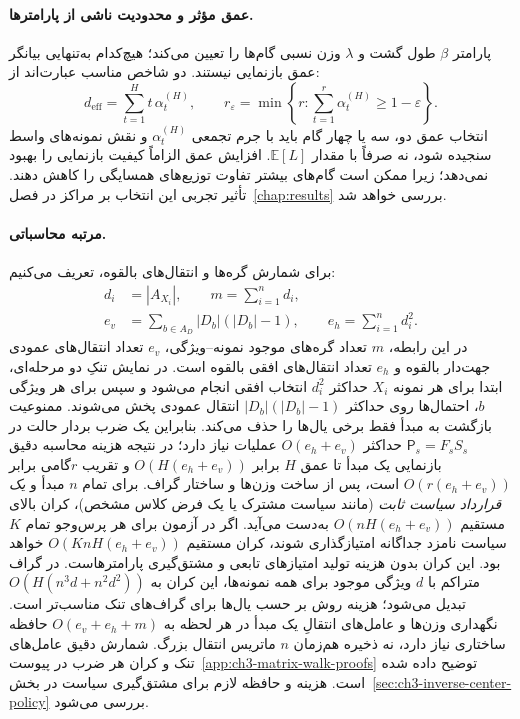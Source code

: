 \paragraph{عمق مؤثر و محدودیت ناشی از پارامترها.}
پارامتر $\beta$ طول گشت و $\lambda$ وزن نسبی گام‌ها را تعیین می‌کند؛ هیچ‌کدام به‌تنهایی بیانگر عمق بازنمایی نیستند. دو شاخص مناسب عبارت‌اند از:
\begin{equation}\label{eq:ch3-effective-depth}
d_{\mathrm{eff}}=\sum_{t=1}^{H}t\,\alpha_t^{(H)},
\qquad
r_\varepsilon=\min\left\{r:\sum_{t=1}^{r}
\alpha_t^{(H)}\ge1-\varepsilon\right\}.
\end{equation}
انتخاب عمق دو، سه یا چهار گام باید با جرم تجمعی $\alpha_t^{(H)}$ و نقش نمونه‌های واسط سنجیده شود، نه صرفاً با مقدار $\mathbb E[L]$. افزایش عمق الزاماً کیفیت بازنمایی را بهبود نمی‌دهد؛ زیرا ممکن است گام‌های بیشتر تفاوت توزیع‌های همسایگی را کاهش دهند. تأثیر تجربی این انتخاب بر مراکز در فصل~\ref{chap:results} بررسی خواهد شد.

\paragraph{مرتبه محاسباتی.}
برای شمارش گره‌ها و انتقال‌های بالقوه، تعریف می‌کنیم:
\begin{equation}\label{eq:ch3-graph-size}
\begin{aligned}
d_i&=|A_{X_i}|,\qquad m=\sum_{i=1}^{n}d_i,\\
e_v&=\sum_{b\in A_D}|D_b|(|D_b|-1),\qquad
e_h=\sum_{i=1}^{n}d_i^2.
\end{aligned}
\end{equation}
در این رابطه، $m$ تعداد گره‌های موجود نمونه--ویژگی، $e_v$ تعداد انتقال‌های عمودی جهت‌دار بالقوه و $e_h$ تعداد انتقال‌های افقی بالقوه است. در نمایش تنکِ دو مرحله‌ای، ابتدا برای هر نمونه $X_i$
حداکثر $d_i^2$ انتخاب افقی انجام می‌شود و سپس
برای هر ویژگی $b$، احتمال‌ها روی حداکثر
$|D_b|(|D_b|-1)$ انتقال عمودی پخش می‌شوند.
ممنوعیت بازگشت به مبدأ فقط برخی یال‌ها را حذف می‌کند.
بنابراین یک ضرب بردار حالت در $\mathsf P_s=F_sS_s$
حداکثر $O(e_h+e_v)$ عملیات نیاز دارد؛ در نتیجه
هزینه محاسبه دقیق بازنمایی یک مبدأ تا عمق $H$ برابر
$O(H(e_h+e_v))$ و تقریب $r$گامی برابر $O(r(e_h+e_v))$ است، پس از ساخت وزن‌ها و ساختار گراف. برای تمام $n$ مبدأ و \emph{یک قرارداد سیاست ثابت}
(مانند سیاست مشترک یا یک فرض کلاس مشخص)،
کران بالای مستقیم $O(nH(e_h+e_v))$ به‌دست می‌آید.
اگر در آزمون برای هر پرس‌وجو تمام $K$ سیاست نامزد
جداگانه امتیازگذاری شوند، کران مستقیم
$O(KnH(e_h+e_v))$ خواهد بود.
این کران بدون هزینه تولید امتیازهای تابعی
و مشتق‌گیری پارامترهاست.
در گراف متراکم با $d$ ویژگی موجود برای همه نمونه‌ها، این کران به
$O(H(n^3d+n^2d^2))$ تبدیل می‌شود؛ هزینه روش بر حسب یال‌ها برای گراف‌های تنک مناسب‌تر است. نگهداری وزن‌ها و عامل‌های انتقالِ یک مبدأ در هر لحظه به $O(e_v+e_h+m)$ حافظه ساختاری نیاز دارد، نه ذخیره هم‌زمان $n$ ماتریس انتقال بزرگ. شمارش دقیق عامل‌های تنک و کران هر ضرب در پیوست~\ref{app:ch3-matrix-walk-proofs} توضیح داده شده است. هزینه و حافظه لازم برای مشتق‌گیری سیاست در بخش~\ref{sec:ch3-inverse-center-policy} بررسی می‌شود.

